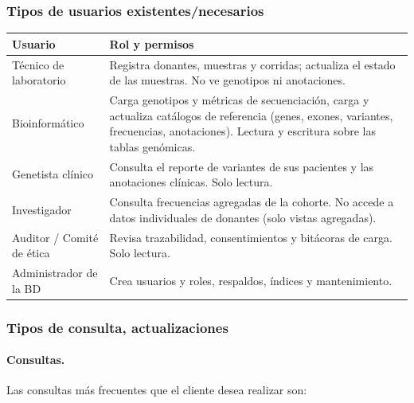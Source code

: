 \documentclass[11pt,a4paper]{article}
\begin{document}
\subsubsection{Tipos de usuarios existentes/necesarios}

\begin{longtable}{>{\raggedright\arraybackslash}p{3.4cm} >{\raggedright\arraybackslash}p{11.6cm}}
\toprule
\textbf{Usuario} & \textbf{Rol y permisos} \\
\midrule
\endhead
Técnico de laboratorio & Registra donantes, muestras y corridas; actualiza el estado de las muestras. No ve genotipos ni anotaciones. \\
Bioinformático & Carga genotipos y métricas de secuenciación, carga y actualiza catálogos de referencia (genes, exones, variantes, frecuencias, anotaciones). Lectura y escritura sobre las tablas genómicas. \\
Genetista clínico & Consulta el reporte de variantes de sus pacientes y las anotaciones clínicas. Solo lectura. \\
Investigador & Consulta frecuencias agregadas de la cohorte. No accede a datos individuales de donantes (solo vistas agregadas). \\
Auditor / Comité de ética & Revisa trazabilidad, consentimientos y bitácoras de carga. Solo lectura. \\
Administrador de la BD & Crea usuarios y roles, respaldos, índices y mantenimiento. \\
\bottomrule
\end{longtable}

\subsubsection{Tipos de consulta, actualizaciones}

\paragraph{Consultas.} Las consultas más frecuentes que el cliente desea realizar son:
\end{document}
